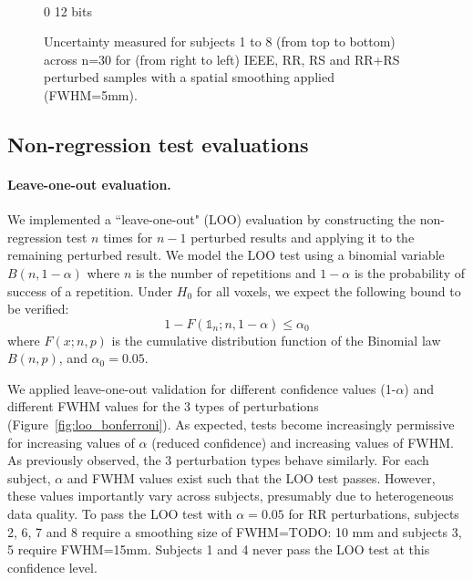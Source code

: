 \documentclass{article}
\newcommand{\TODO}[1]{\color{red}\textsc{TODO:} #1\color{black}\xspace}
\begin{document}
\begin{landscape}
\begin{figure}
\begin{subfigure}[t]{0.2\paperheight}
        \end{subfigure} \\
        \hspace*{6cm} 0  12 bits
        \caption{Uncertainty measured for subjects 1 to 8 (from top to bottom) across n=30 for
            (from right to left) IEEE, RR, RS and RR+RS perturbed samples with a spatial smoothing applied (FWHM=5mm). }
        \label{fig:uncertainty_sub_1}

    \end{figure}
\end{landscape}


\subsection{Non-regression test evaluations}

\paragraph{Leave-one-out evaluation.} We implemented a ``leave-one-out" (LOO)
evaluation by constructing the non-regression test $n$ times for $n-1$ perturbed results
and applying it to the remaining perturbed result. We model the LOO test
using a binomial variable $B(n,1-\alpha)$
where $n$ is the number of repetitions and $1-\alpha$ is
the probability of success of a repetition. Under $H_0$ for all voxels, we
expect the following
bound to be verified:
\[
    1-F(\mathds{1}_n;n,1-\alpha) \leq \alpha_0
\]
where $F(x;n,p)$ is the cumulative distribution function of the Binomial law $B(n,p)$, and
$\alpha_0=0.05$.

We applied leave-one-out validation for
different  confidence values (1-$\alpha$) and different FWHM  values for the
3 types of perturbations (Figure~\ref{fig:loo_bonferroni}). As expected, tests
become increasingly permissive for increasing values of $\alpha$ (reduced
confidence) and increasing values of FWHM. As previously observed, the 3 perturbation types
behave similarly. For each subject, $\alpha$ and FWHM values exist such that
the LOO test passes. However, these values importantly vary across subjects, presumably
due to heterogeneous data quality. To pass the LOO
test with $\alpha=0.05$ for RR perturbations,
subjects 2, 6, 7 and 8 require a smoothing size of FWHM=\TODO{10}mm and
subjects 3, 5 require FWHM=15mm. Subjects 1 and 4 never pass the LOO test
at this confidence level.
\end{document}
